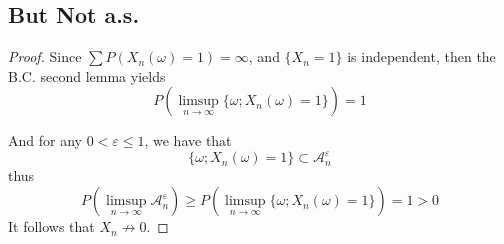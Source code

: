     \subsection{But Not a.s.}
    \begin{proof}
        Since $\sum P(X_n(\omega)=1)=\infty$, and $\{X_n=1\}$ is
        independent,
        then the B.C. second lemma yields 
        \[P\left(\limsup_{n\to\infty}\{\omega;X_n(\omega)=1\}\right)=1\]

        And for any $0<\varepsilon\leq 1$, we have that
        \[\{\omega;X_n(\omega)=1\}\subset\mathcal A_n^\varepsilon\]
        thus
        \[P\left(\limsup_{n\to\infty}\mathcal A_n^\varepsilon\right)\geq
        P\left(\limsup_{n\to\infty}\{\omega;X_n(\omega)=1\}\right)=1>0\]
        It follows that 
        $X_n\not\to 0$.
    \end{proof}

